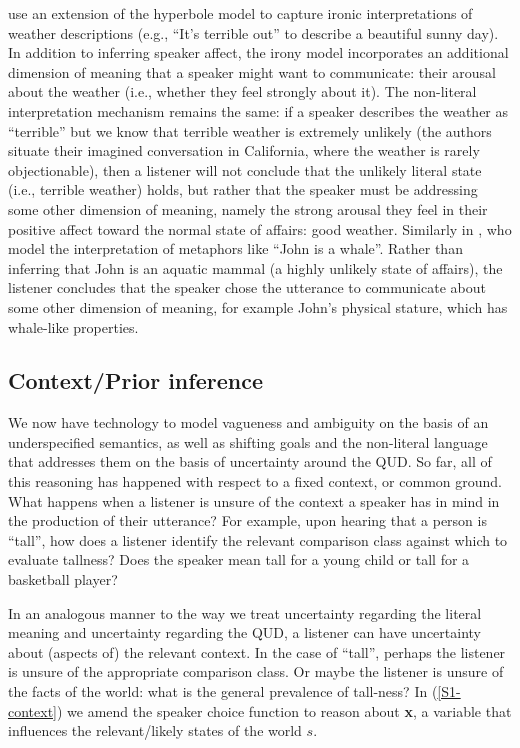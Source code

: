\documentclass{sp}
\newcommand{\gcs}[1]{\textcolor{blue}{[gcs: #1]}}
\newcommand{\mf}[1]{\textcolor{orange}{[mf: #1]}}
\newcommand{\mht}[1]{\textcolor{purple}{[mht: #1]}}
\begin{document}
\cite{kaogoodman2015} use an extension of the hyperbole model to capture ironic interpretations of weather descriptions (e.g., ``It's terrible out'' to describe a beautiful sunny day). In addition to inferring speaker affect, the irony model incorporates an additional dimension of meaning that a speaker might want to communicate: their arousal about the weather (i.e., whether they feel strongly about it). The non-literal interpretation mechanism remains the same: if a speaker describes the weather as ``terrible'' but we know that terrible weather is extremely unlikely (the authors situate their imagined conversation in California, where the weather is rarely objectionable), then a listener will not conclude that the unlikely literal state (i.e., terrible weather) holds, but rather that the speaker must be addressing some other dimension of meaning, namely the strong arousal they feel in their positive affect toward the normal state of affairs: good weather. Similarly in \cite{kaoetal2014metaphor}, who model the interpretation of metaphors like ``John is a whale''. Rather than inferring that John is an aquatic mammal (a highly unlikely state of affairs), the listener concludes that the speaker chose the utterance to communicate about some other dimension of meaning, for example John's physical stature, which has whale-like properties.

\subsection{Context/Prior inference} \label{context-inference}

We now have technology to model vagueness and ambiguity on the basis of an underspecified semantics, as well as shifting goals and the non-literal language that addresses them on the basis of uncertainty around the QUD. So far, all of this reasoning has happened with respect to a fixed context, or common ground. What happens when a listener is unsure of the context a speaker has in mind in the production of their utterance? %
For example, upon hearing that a person is ``tall'', how does a listener identify the relevant comparison class against which to evaluate tallness? Does the speaker mean tall for a young child or tall for a basketball player?

In an analogous manner to the way we treat uncertainty regarding the literal meaning and uncertainty regarding the QUD, a listener can have uncertainty about (aspects of) the relevant context. In the case of ``tall'', perhaps the listener is unsure of the appropriate comparison class. Or maybe the listener is unsure of the facts of the world: what is the general prevalence of tall-ness? In (\ref{S1-context}) we amend the speaker choice function to reason about \textbf{x}, a variable that influences the relevant/likely states of the world $s$.
\end{document}
